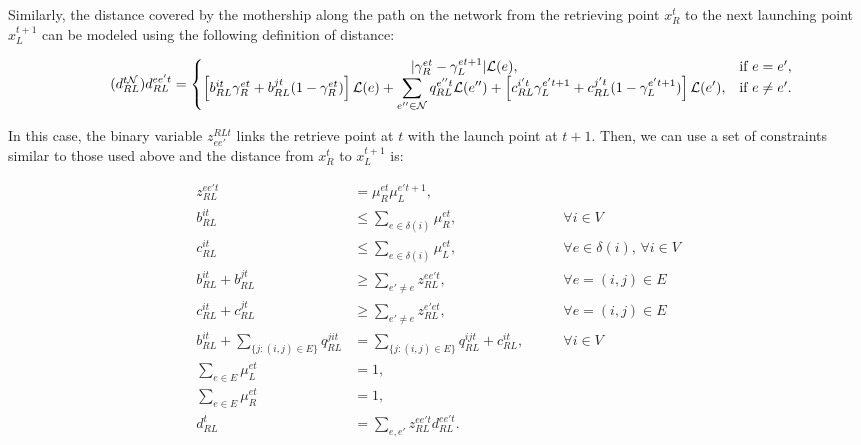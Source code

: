\medskip

Similarly, the distance covered by the mothership along the path on the network from the retrieving point $x_R^t$ to the next launching point $x_L^{t+1}$ can be modeled using the following definition of distance:

\begin{equation}\tag{$d^{t\mathcal N}_{RL}$}\label{eq:dRLNt}
d_{RL}^{ee't} = \left\{\begin{matrix}
|\gamma_{R}^{et} - \gamma_{L}^{et+1}|\mathcal L(e), & \text{if } e = e',\\ 
\left[b_{RL}^{it}\gamma_{R}^{et} + b_{RL}^{jt}(1 - \gamma_{R}^{et})\right]\mathcal L(e) + \displaystyle \sum_{e''\in \mathcal N}q_{RL}^{e''t}\mathcal L(e'') + \left[c_{RL}^{i't}\gamma_{L}^{e't+1} + c_{RL}^{j't}(1 - \gamma_{L}^{e't+1})\right]\mathcal{L}(e'), & \text{if } e \neq e'.
\end{matrix}\right.
\end{equation}

In this case, the binary variable $z_{ee'}^{RLt}$ links the retrieve point at $t$ with the launch point at $t+1$. Then, we can use a set of constraints similar to those used above and the distance from $x_R^t$ to $x_L^{t+1}$ is:

\begin{align}
    z_{RL}^{ee't} & = \mu_{R}^{et}\mu_{L}^{e't+1},\label{st1:prodRL}\\
    b_{RL}^{it} & \leq \sum_{e\in\delta(i)}\mu_{R}^{et}, \label{st1:bRt1}&\qquad \forall i\in V \\
    c_{RL}^{it} & \leq \sum_{e\in\delta(i)}\mu_{L}^{et}, \label{st1:cRt1}&\qquad \forall e\in\delta(i),\,\forall i\in V\\
    b_{RL}^{it} + b_{RL}^{jt} & \geq \sum_{e'\neq e} z_{RL}^{ee't}, &\qquad \forall e=(i, j)\in E\label{st1:bRt2}\\
    c_{RL}^{it} + c_{RL}^{jt} & \geq \sum_{e'\neq e} z_{RL}^{e'et}, &\qquad \forall e=(i, j)\in E\label{st1:cRt2}\\
    b_{RL}^{it} + \sum_{\{j:(i, j)\in E\}} q_{RL}^{jit} & = \sum_{\{j:(i, j)\in E\}} q_{RL}^{ijt} +  c_{RL}^{it}, \label{st1:flow}&\qquad \forall i \in V\\
    \sum_{e\in E} \mu_{L}^{et} & = 1,  \label{st1:muLe} \\
    \sum_{e\in E} \mu_{R}^{et} & = 1, \label{st1:muRe}\\
    d_{RL}^t & = \sum_{e, e'} z_{RL}^{ee't} d_{RL}^{ee't}. \label{st1:dRLtN}
\end{align}

